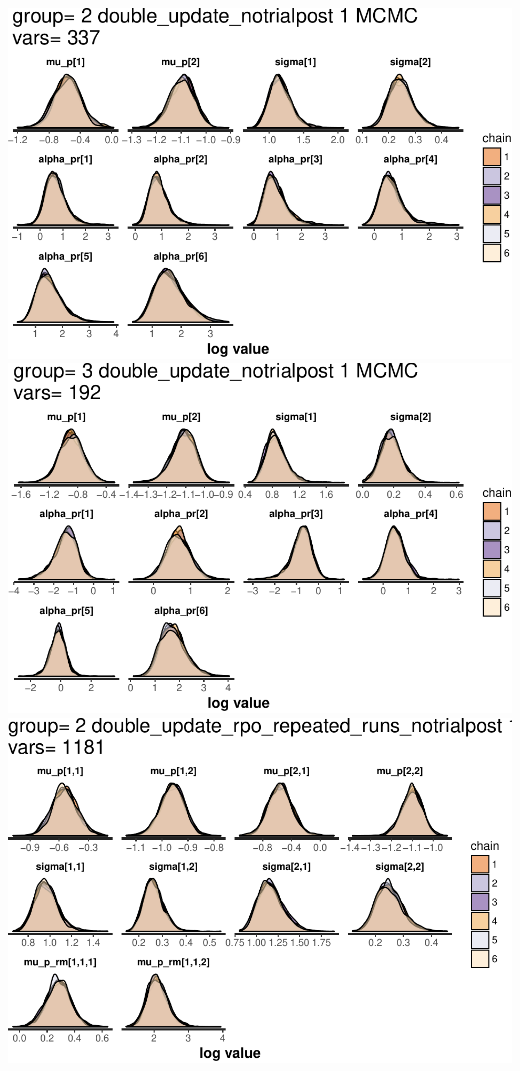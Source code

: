 \documentclass[]{article}
\begin{document}
\includegraphics{compare_vb_and_MCMC_files/figure-latex/StanPlotDensity-1.pdf}
\includegraphics{compare_vb_and_MCMC_files/figure-latex/StanPlotDensity-2.pdf}
\includegraphics{compare_vb_and_MCMC_files/figure-latex/StanPlotDensity-3.pdf}
\end{document}
